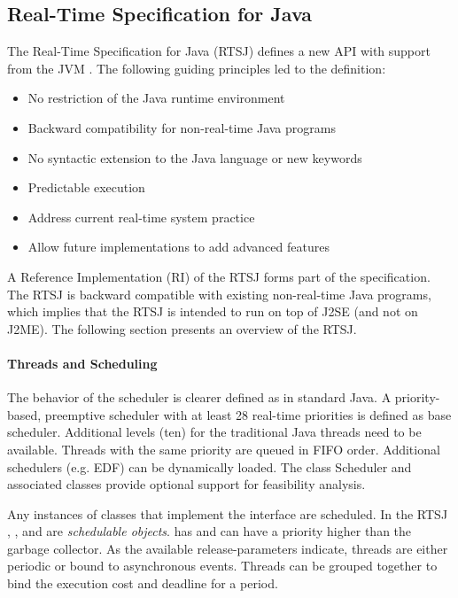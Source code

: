 \subsection{Real-Time Specification for Java}
\label{sec:rtsj}

The Real-Time Specification for Java (RTSJ) defines a new API with
support from the JVM \cite{rtsj}. The following guiding principles
led to the definition:
%
\begin{itemize}
    \item No restriction of the Java runtime environment
    \item Backward compatibility for non-real-time Java programs
    \item No syntactic extension to the Java
language or new keywords
    \item Predictable execution
    \item Address current real-time system practice
    \item Allow future implementations to add advanced features
\end{itemize}
%
A Reference Implementation (RI) of the RTSJ forms part of the
specification. The RTSJ is backward compatible with existing
non-real-time Java programs, which implies that the RTSJ is intended
to run on top of J2SE (and not on J2ME). The following section
presents an overview of the RTSJ.

\paragraph{Threads and Scheduling}

The behavior of the scheduler is clearer defined as in standard
Java. A priority-based, preemptive scheduler with at least 28
real-time priorities is defined as base scheduler. Additional levels
(ten) for the traditional Java threads need to be available. Threads
with the same priority are queued in FIFO order. Additional
schedulers (e.g. EDF) can be dynamically loaded. The class Scheduler
and associated classes provide optional support for feasibility
analysis.


Any instances of classes that implement the interface
 are scheduled. In the RTSJ ,
, and  are
\textit{schedulable objects}.  has and
 can have a priority higher than the garbage
collector. As the available release-parameters indicate, threads are
either periodic or bound to asynchronous events. Threads can be
grouped together to bind the execution cost and deadline for a
period.

